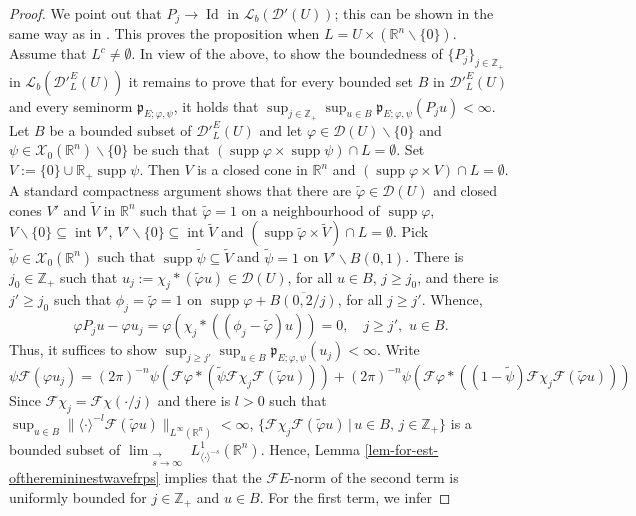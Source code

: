 \documentclass[12pt,reqno]{amsart}
\newcommand{\RR}{\mathbb R}
\newcommand{\ZZ}{\mathbb Z}
\newcommand{\DD}{\mathcal D}
\newcommand{\XX}{\mathcal X}
\newcommand{\supp}{\operatorname{supp}}
\theoremstyle{plain}
\theoremstyle{remark}
\theoremstyle{definition}
\numberwithin{equation}{section}
\begin{document}
\begin{proof}
We point out that $P_j\rightarrow\operatorname{Id}$ in $\mathcal{L}_b(\DD'(U))$; this can be shown in the same way as in \cite[Proposition 3.13]{PP}. This proves the proposition when $L=U\times (\RR^n\backslash\{0\})$.\\
\indent Assume that $L^c\neq\emptyset$. In view of the above, to show the boundedness of $\{P_j\}_{j\in\ZZ_+}$ in $\mathcal{L}_b(\DD'^E_L(U))$ it remains to prove that for every bounded set $B$ in $\DD'^E_L(U)$ and every seminorm $\mathfrak{p}_{E;\varphi,\psi}$, it holds that $\sup_{j\in\ZZ_+}\sup_{u\in B}\mathfrak{p}_{E;\varphi,\psi}(P_j u)<\infty$. Let $B$ be a bounded subset of $\DD'^E_L(U)$ and let $\varphi\in\DD(U)\backslash\{0\}$ and $\psi\in\XX_0(\RR^n)\backslash\{0\}$ be such that $(\supp\varphi\times\supp\psi)\cap L=\emptyset$. Set $V:=\{0\}\cup\RR_+\supp\psi$. Then $V$ is a closed cone in $\RR^n$ and $(\supp\varphi\times V)\cap L=\emptyset$. A standard compactness argument shows that there are $\widetilde{\varphi}\in\DD(U)$ and closed cones $V'$ and $\widetilde{V}$ in $\RR^n$ such that $\widetilde{\varphi}=1$ on a neighbourhood of $\supp\varphi$, $V\backslash\{0\}\subseteq\operatorname{int}V'$, $V'\backslash\{0\}\subseteq \operatorname{int}\widetilde{V}$ and $(\supp\widetilde{\varphi}\times\widetilde{V})\cap L=\emptyset$. Pick $\widetilde{\psi}\in \XX_0(\RR^n)$ such that $\supp\widetilde{\psi}\subseteq \widetilde{V}$ and $\widetilde{\psi}=1$ on $V'\backslash B(0,1)$. There is $j_0\in\ZZ_+$ such that $u_j:=\chi_j*(\widetilde{\varphi} u)\in\DD(U)$, for all $u\in B$, $j\geq j_0$, and there is $j'\geq j_0$ such that $\phi_j=\widetilde{\varphi}=1$ on $\supp\varphi +\overline{B(0,2/j)}$, for all $j\geq j'$. Whence,
$$
\varphi P_ju-\varphi u_j=\varphi(\chi_j*((\phi_j-\widetilde{\varphi})u))=0,\quad j\geq j',\,\, u\in B.
$$
Thus, it suffices to show $\sup_{j\geq j'}\sup_{u\in B}\mathfrak{p}_{E;\varphi,\psi}(u_j)<\infty$. Write
\begin{equation*}
\psi\mathcal{F}(\varphi u_j)= (2\pi)^{-n}\psi\left(\mathcal{F}\varphi*\left(\widetilde{\psi}\mathcal{F}\chi_j\mathcal{F}(\widetilde{\varphi}u)\right)\right) +(2\pi)^{-n}\psi\left(\mathcal{F}\varphi*\left((1-\widetilde{\psi})\mathcal{F}\chi_j\mathcal{F}(\widetilde{\varphi}u)\right)\right)
\end{equation*}
Since $\mathcal{F}\chi_j=\mathcal{F}\chi(\cdot/j)$ and there is $l>0$ such that $\sup_{u\in B}\|\langle\cdot\rangle^{-l}\mathcal{F}(\widetilde{\varphi}u)\|_{L^{\infty}(\RR^n)}<\infty$, $\{\mathcal{F}\chi_j\mathcal{F}(\widetilde{\varphi}u)\,|\, u\in B,\, j\in\ZZ_+\}$ is a bounded subset of $\displaystyle \lim_{\substack{\longrightarrow\\ s\rightarrow\infty}}L^1_{\langle\cdot\rangle^{-s}}(\RR^n)$. Hence, Lemma \ref{lem-for-est-oftheremininestwavefrps} implies that the $\mathcal{F}E$-norm of the second term is uniformly bounded for $j\in\ZZ_+$ and $u\in B$. For the first term, we infer

\end{proof}
\end{document}
